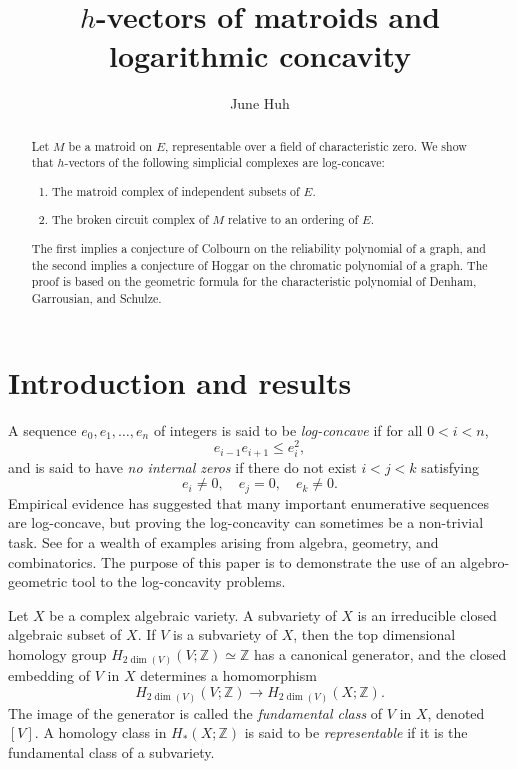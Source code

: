 \documentclass{compositio}
\theoremstyle{definition}
\theoremstyle{remark}
\begin{document}
\title[$h$-vectors of matroids and logarithmic concavity]{$h$-vectors of matroids and logarithmic concavity}
\author{June Huh}
\address{Department of Mathematics, University of Michigan\\
Ann Arbor, MI 48109 \\ USA}
\begin{abstract}
Let $M$ be a matroid on $E$, representable over a field of characteristic zero. We show that $h$-vectors of the following simplicial complexes are log-concave:
\begin{enumerate}[1.]
\item The matroid complex of independent subsets of $E$.
\item The broken circuit complex of $M$ relative to an ordering of $E$.
\end{enumerate}
The first implies a conjecture of Colbourn on the reliability polynomial of a graph, and the second implies a conjecture of Hoggar on the chromatic polynomial of a graph.
The proof is based on the geometric formula for the characteristic polynomial of Denham, Garrousian, and Schulze.
\end{abstract}

\maketitle 

\section{Introduction and results}

A sequence $e_0,e_1,\ldots,e_n$ of integers is said to be 
\emph{log-concave} if for all $0< i< n$,
\[
e_{i-1}e_{i+1}\le e_i^2,
\]
and is said to have \emph{no internal zeros} if there do not exist $i < j <  k$ satisfying 
\[
e_i \neq 0, \quad e_j=0, \quad e_k\neq 0.
\] 
Empirical evidence has suggested that many important enumerative sequences are log-concave, but proving the log-concavity can sometimes be a non-trivial task. See \cite{Brenti,Stanley,Stanley00} for a wealth of examples arising from algebra, geometry, and combinatorics. The purpose of this paper is to demonstrate the use of an algebro-geometric tool to the log-concavity problems.

Let $X$ be a complex algebraic variety. A subvariety of $X$ is an irreducible closed algebraic subset of $X$. 
If $V$ is a subvariety of $X$, then the top dimensional homology group $H_{2\dim(V)}(V;\mathbb{Z}) \simeq \mathbb{Z}$ has a canonical generator, and the closed embedding of $V$ in $X$ determines a homomorphism
\[
H_{2\dim(V)}(V;\mathbb{Z}) \longrightarrow H_{2\dim(V)}(X;\mathbb{Z}).
\]
The image of the generator is called the \emph{fundamental class} of $V$ in $X$, denoted $[V]$. A homology class in $H_*(X;\mathbb{Z})$ is said to be \emph{representable} if it is the fundamental class of a subvariety. 
\end{document}
